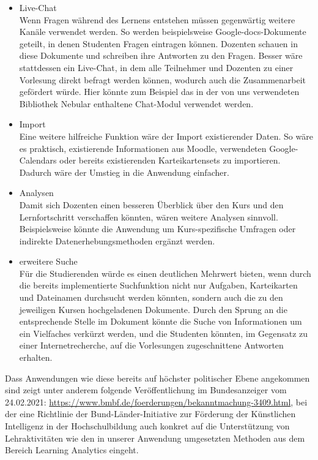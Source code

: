 \begin{itemize}
    \item Live-Chat\\
        Wenn Fragen während des Lernens entstehen müssen gegenwärtig weitere Kanäle verwendet werden.
        So werden beispielsweise Google-docs-Dokumente geteilt, in denen Studenten Fragen eintragen können.
        Dozenten schauen in diese Dokumente und schreiben ihre Antworten zu den Fragen.
        Besser wäre stattdessen ein Live-Chat, in dem alle Teilnehmer und Dozenten zu einer Vorlesung direkt befragt werden können, wodurch auch die Zusammenarbeit gefördert würde. Hier könnte zum Beispiel das in der von uns  verwendeten Bibliothek Nebular enthaltene Chat-Modul verwendet werden.
    \item Import\\
        Eine weitere hilfreiche Funktion wäre der Import existierender Daten.
        So wäre es praktisch, existierende Informationen aus Moodle, verwendeten Google-Calendars oder bereits existierenden Karteikartensets zu importieren. Dadurch wäre der Umstieg in die Anwendung einfacher. 
    \item Analysen\\
        Damit sich Dozenten einen besseren Überblick über den Kurs und den Lernfortschritt verschaffen könnten, wären weitere Analysen sinnvoll. Beispielsweise könnte die Anwendung um Kurs-spezifische Umfragen oder indirekte Datenerhebungsmethoden ergänzt werden.
    \item erweitere Suche\\
		Für die Studierenden würde es einen deutlichen Mehrwert bieten, wenn durch die bereits implementierte Suchfunktion nicht nur Aufgaben, Karteikarten und Dateinamen durchsucht werden könnten, sondern auch die zu den jeweiligen Kursen hochgeladenen Dokumente. Durch den Sprung an die entsprechende Stelle im Dokument könnte die Suche von Informationen um ein Vielfaches verkürzt werden, und die Studenten könnten, im Gegensatz zu einer Internetrecherche, auf die Vorlesungen zugeschnittene Antworten erhalten.
\end{itemize}

Dass Anwendungen wie diese bereits auf höchster politischer Ebene angekommen sind zeigt unter anderem folgende Veröffentlichung im Bundesanzeiger vom 24.02.2021: \url{https://www.bmbf.de/foerderungen/bekanntmachung-3409.html}, bei der eine Richtlinie der Bund-Länder-Initiative zur Förderung der Künstlichen Intelligenz in der Hochschulbildung auch konkret auf die Unterstützung von Lehraktivitäten wie den in unserer Anwendung umgesetzten Methoden aus dem Bereich Learning Analytics eingeht.